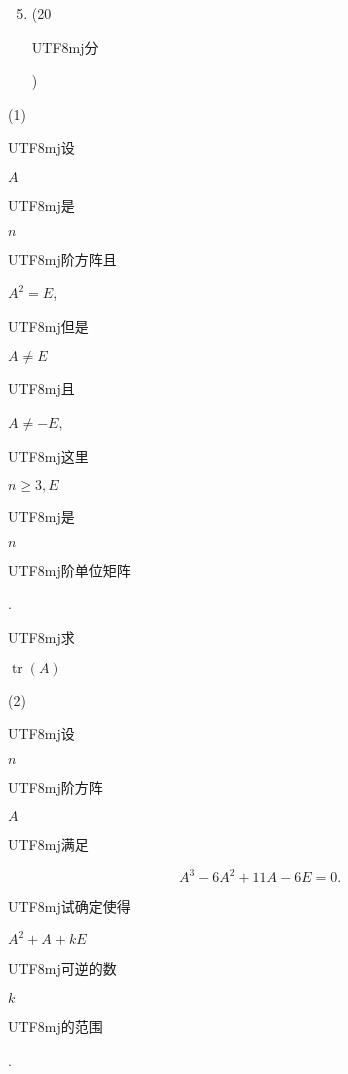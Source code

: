 \documentclass[10pt]{article}
\begin{document}
\begin{enumerate}
  \setcounter{enumi}{4}
  \item (20 \begin{CJK}{UTF8}{mj}分\end{CJK})
\end{enumerate}
(1) \begin{CJK}{UTF8}{mj}设\end{CJK} $A$ \begin{CJK}{UTF8}{mj}是\end{CJK} $n$ \begin{CJK}{UTF8}{mj}阶方阵且\end{CJK} $A^{2}=E$, \begin{CJK}{UTF8}{mj}但是\end{CJK} $A \neq E$ \begin{CJK}{UTF8}{mj}且\end{CJK} $A \neq-E$, \begin{CJK}{UTF8}{mj}这里\end{CJK} $n \geqslant 3, E$ \begin{CJK}{UTF8}{mj}是\end{CJK} $n$ \begin{CJK}{UTF8}{mj}阶单位矩阵\end{CJK}. \begin{CJK}{UTF8}{mj}求\end{CJK} $\operatorname{tr}(A)$

(2) \begin{CJK}{UTF8}{mj}设\end{CJK} $n$ \begin{CJK}{UTF8}{mj}阶方阵\end{CJK} $A$ \begin{CJK}{UTF8}{mj}满足\end{CJK}
$$
A^{3}-6 A^{2}+11 A-6 E=0 .
$$
\begin{CJK}{UTF8}{mj}试确定使得\end{CJK} $A^{2}+A+k E$ \begin{CJK}{UTF8}{mj}可逆的数\end{CJK} $k$ \begin{CJK}{UTF8}{mj}的范围\end{CJK}.
\end{document}
